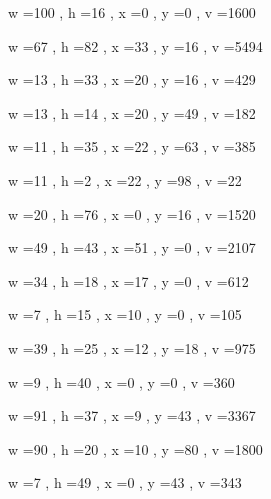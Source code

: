 \documentclass[11pt]{article}
\begin{document}
w =100 , h =16 , x =0 , y =0 , v =1600
\par
w =67 , h =82 , x =33 , y =16 , v =5494
\par
w =13 , h =33 , x =20 , y =16 , v =429
\par
w =13 , h =14 , x =20 , y =49 , v =182
\par
w =11 , h =35 , x =22 , y =63 , v =385
\par
w =11 , h =2 , x =22 , y =98 , v =22
\par
w =20 , h =76 , x =0 , y =16 , v =1520
\par
\newpage




w =49 , h =43 , x =51 , y =0 , v =2107
\par
w =34 , h =18 , x =17 , y =0 , v =612
\par
w =7 , h =15 , x =10 , y =0 , v =105
\par
w =39 , h =25 , x =12 , y =18 , v =975
\par
w =9 , h =40 , x =0 , y =0 , v =360
\par
w =91 , h =37 , x =9 , y =43 , v =3367
\par
w =90 , h =20 , x =10 , y =80 , v =1800
\par
w =7 , h =49 , x =0 , y =43 , v =343
\par
\newpage
\end{document}
